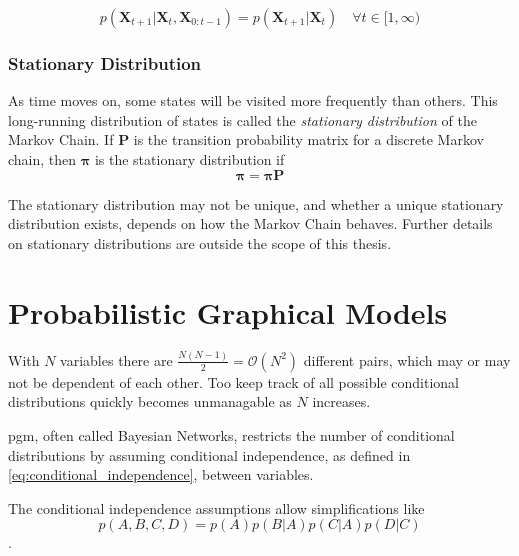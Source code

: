 \begin{equation}\label{eq:theory_markov_property}
p(\mathbf{X}_{t+1} | \mathbf{X}_t,  \mathbf{X}_{0:t-1}) = p(\mathbf{X}_{t+1} | \mathbf{X}_t)  \quad \forall t \in [1, \infty)
\end{equation}

\subsubsection{Stationary Distribution}
As time moves on, some states will be visited more frequently than others. This long-running distribution of states is called the \textit{stationary distribution} of the Markov Chain. If $\mathbf{P}$ is the transition probability matrix for a discrete Markov chain, then $\boldsymbol{\pi}$ is the stationary distribution if 
\begin{equation}
    \boldsymbol{\pi} = \boldsymbol{\pi} \mathbf{P}
\end{equation}

The stationary distribution may not be unique, and whether a unique stationary distribution exists, depends on how the Markov Chain behaves. Further details on stationary distributions are outside the scope of this thesis. 



\section{Probabilistic Graphical Models}
With $N$ variables there are $\frac{N(N-1)}{2} = \mathcal{O}(N^2)$ different pairs, which may or may not be dependent of each other. Too keep track of all possible conditional distributions quickly becomes unmanagable as $N$ increases. 

\acrfull{pgm}, often called Bayesian Networks, restricts the number of conditional distributions by assuming conditional independence, as defined in \cref{eq:conditional_independence}, between variables. 

The conditional independence assumptions allow simplifications like $$p(A, B, C, D) = p(A)p(B | A)p(C | A) p(D | C)$$.


